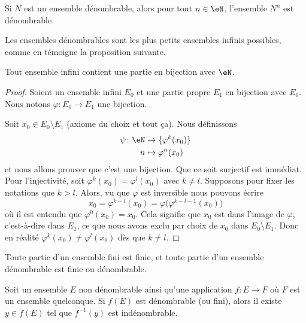 \begin{proposition}     \label{PROPooDMZHooXouDrQ}
    Si \( N\) est un ensemble dénombrable, alors pour tout \( n\in \eN\), l'ensemble \( N^n\) est dénombrable.
\end{proposition}

Les ensembles dénombrables sont les plus petits ensembles infinis possibles, comme en témoigne la proposition suivante.
\begin{proposition}      \label{PROPooUIPAooCUEFme}
    Tout ensemble infini contient une partie en bijection avec \( \eN\).
\end{proposition}

\begin{proof}
    Soient un ensemble infini \( E_0\) et une partie propre \( E_1\) en bijection avec \( E_0\). Nous notons \( \varphi\colon E_0\to E_1\) une bijection.

    Soit \( x_0\in E_0\setminus E_1\) (axiome du choix et tout ça). Nous définissons
    \begin{equation}
        \begin{aligned}
            \psi\colon \eN&\to \{\varphi^k(x_0)\} \\
            n&\mapsto \varphi^n(x_0)
        \end{aligned}
    \end{equation}
    et nous allons prouver que c'est une bijection. Que ce soit surjectif est immédiat. Pour l'injectivité, soit \( \varphi^k(x_0)=\varphi^l(x_0)\) avec \( k\neq l\). Supposons pour fixer les notations que \( k>l\). Alors, vu que \( \varphi\) est inversible nous pouvons écrire
    \begin{equation}
        x_0=\varphi^{k-l}(x_0)=\varphi\big( \varphi^{k-l-1}(x_0) \big)
    \end{equation}
    où il est entendu que \( \varphi^0(x_0)=x_0\). Cela signifie que \( x_0\) est dans l'image de \( \varphi\), c'est-à-dire dans $E_1$, ce que nous avons exclu par choix de \( x_0\) dans \( E_0\setminus E_1\). Donc en réalité \( \varphi^k(x_0)\neq \varphi^l(x_0)\) dès que \( k\neq l\).
\end{proof}

\begin{proposition} \label{PropQEPoozLqOQ}
    Toute partie d'un ensemble fini est finie, et toute partie d'un ensemble dénombrable est finie ou dénombrable.
\end{proposition}

\begin{lemma}   \label{LEMooGTOTooFbpvzU}
    Soit un ensemble \( E\) non dénombrable ainsi qu'une application \( f\colon E\to F\) où \( F\) est un ensemble quelconque. Si \( f(E)\) est dénombrable (ou fini), alors il existe \( y\in f(E)\) tel que \( f^{-1}(y)\) est indénombrable.
\end{lemma}


